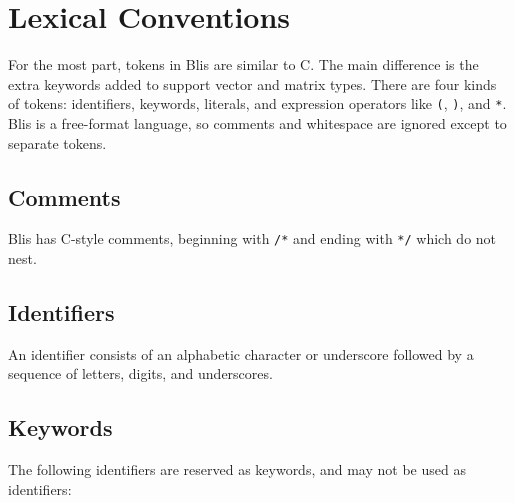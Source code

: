\documentclass[11pt]{article}
\newcommand{\code}[1]{\texttt{#1}}
\begin{document}
\section{Lexical Conventions}

For the most part, tokens in Blis are similar to C. The main difference is the extra keywords added to support vector and matrix types. There are four kinds of tokens: identifiers, keywords, literals, and expression operators like \code{(}, \code{)}, and \code{*}. Blis is a free-format language, so comments and whitespace are ignored except to separate tokens.

\subsection{Comments}

Blis has C-style comments, beginning with \code{/*} and ending with \code{*/} which do not nest.

\subsection{Identifiers}

An identifier consists of an alphabetic character or underscore followed by a sequence of letters, digits, and underscores.

\subsection{Keywords}

The following identifiers are reserved as keywords, and may not be used as identifiers:
\end{document}
